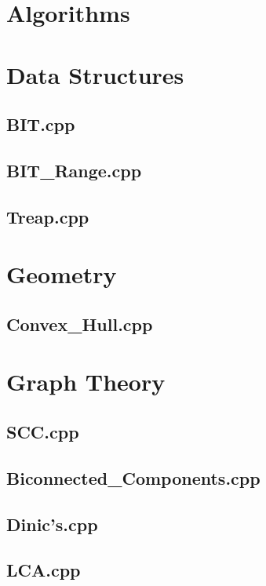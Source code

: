 \section{Algorithms}
\section{Data Structures}
\subsection{BIT.cpp}

\subsection{BIT\_Range.cpp}

\subsection{Treap.cpp}

\section{Geometry}
\subsection{Convex\_Hull.cpp}

\section{Graph Theory}
\subsection{SCC.cpp}

\subsection{Biconnected\_Components.cpp}

\subsection{Dinic's.cpp}

\subsection{LCA.cpp}

